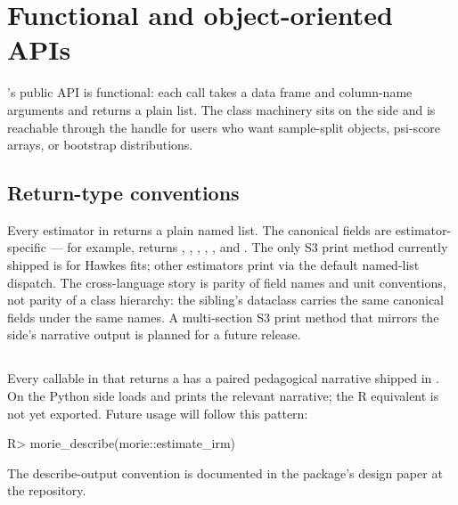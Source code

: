 \documentclass[article,shortnames,nojss]{jss}
\begin{document}
\section{Functional and object-oriented APIs}
\label{sec:api}

's public API is functional: each
 call takes a data frame and column-name
arguments and returns a plain  list. The
class machinery sits on the  side and is reachable
through the  handle for users who want
sample-split objects, psi-score arrays, or bootstrap
distributions.

\subsection[Return-type conventions]{Return-type conventions}\label{sec:richresult}

Every estimator in  returns a plain 
named list. The canonical fields are estimator-specific --- for
example,  returns ,
, , , , and
. The only S3 print method currently shipped is
 for Hawkes fits; other estimators
print via the default named-list dispatch. The cross-language
story is parity of field names and unit conventions, not parity of
a class hierarchy: the  sibling's
 dataclass \citep{Ruhela2026MoriePy} carries the
same canonical fields under the same names. A multi-section S3
print method that mirrors the  side's narrative
output is planned for a future release.

\subsection[describe()]{}\label{sec:describe}

Every callable in  that returns a 
has a paired  pedagogical narrative
shipped in .  On the Python side  loads and prints the
relevant narrative; the R equivalent is not yet exported. Future
usage will follow this pattern:

\begin{Code}
R> morie_describe(morie::estimate_irm)
\end{Code}

\noindent The describe-output convention is documented in the
package's design paper at the repository.
\end{document}
